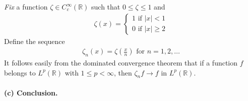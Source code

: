 \documentclass[a4paper,oneside]{article}
\numberwithin{equation}{section}
\begin{document}
\textit{Fix} a function $\zeta  \in C_c^\infty \left( \mathbb{R} \right)$ such that $0\le \zeta \le 1$ and
\begin{align}
\zeta \left( x \right) = \left\{ {\begin{array}{*{20}{c}}
{1\mbox{ if } \left| x \right| < 1}\\
{0\mbox{ if } \left| x \right| \ge 2}
\end{array}} \right.
\end{align}
Define the sequence
\begin{align}
{\zeta _n}\left( x \right) = \zeta \left( {\frac{x}{n}} \right)\mbox{ for } n = 1,2, \ldots 
\end{align}
It follows easily from the dominated convergence theorem that if a function $f$ belongs to $L^p\left(\mathbb{R}\right)$ with $1\le p<\infty$, then $\zeta _nf\to f$ in $L^p\left(\mathbb{R}\right)$.\\
\\
\textbf{(c) Conclusion.} 
\end{document}
